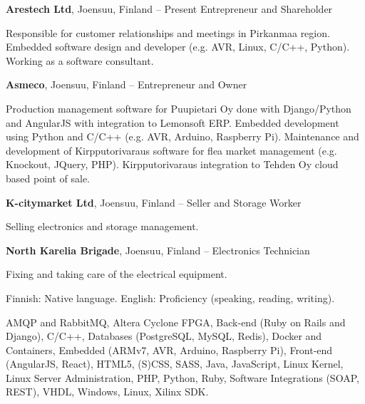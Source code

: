 \documentclass[letterpaper,MMMyyyy,nonstopmode]{simpleresumecv}
\begin{document}
\begin{Body}
\BigGap
\Entry
\textbf{Arestech Ltd}, Joensuu, Finland
\hfill
{} -- Present
\Gap
\BulletItem Entrepreneur and Shareholder
\begin{Detail}
    \SubBulletItem Responsible for customer relationships and meetings in
    Pirkanmaa region.
    \SubBulletItem Embedded software design and developer (e.g. AVR, Linux,
    C/C++, Python).
    \SubBulletItem Working as a software consultant.
\end{Detail}

\BigGap
\Entry
\textbf{Asmeco}, Joensuu, Finland
\hfill
{} -- 
\Gap
\BulletItem Entrepreneur and Owner
\begin{Detail}
    \SubBulletItem Production management software for Puupietari Oy done with
    Django/Python and \newline AngularJS with integration to Lemonsoft ERP.
    \SubBulletItem Embedded development using Python and C/C++ (e.g. AVR,
    Arduino, Raspberry Pi).
    \SubBulletItem Maintenance and development of Kirpputorivaraus software for
    flea market \newline management (e.g. Knockout, JQuery, PHP).
    \SubBulletItem Kirpputorivaraus integration to Tehden Oy cloud based point
    of sale.
\end{Detail}

\BigGap
\Entry
\textbf{K-citymarket Ltd}, Joensuu, Finland
\hfill
{} -- 
\Gap
\BulletItem Seller and Storage Worker
\begin{Detail}
    \SubBulletItem Selling electronics and storage management.
\end{Detail}

\BigGap
\Entry
\textbf{North Karelia Brigade}, Joensuu, Finland
\hfill
{} -- 
\Gap
\BulletItem Electronics Technician
\begin{Detail}
    \SubBulletItem Fixing and taking care of the electrical equipment.
\end{Detail}

\newpage



\BulletItem Finnish: Native language.
\Gap
\BulletItem English: Proficiency (speaking, reading, writing).



\Entry
\BulletItem AMQP and RabbitMQ,
\BulletItem Altera Cyclone FPGA,
\BulletItem Back-end (Ruby on Rails and Django),
\BulletItem C/C++,
\BulletItem Databases (PostgreSQL, MySQL, Redis),
\BulletItem Docker and Containers,
\BulletItem Embedded (ARMv7, AVR, Arduino, Raspberry Pi),
\BulletItem Front-end (AngularJS, React),
\BulletItem HTML5, (S)CSS, SASS,
\BulletItem Java,
\BulletItem JavaScript,
\BulletItem Linux Kernel,
\BulletItem Linux Server Administration,
\BulletItem PHP,
\BulletItem Python,
\BulletItem Ruby,
\BulletItem Software Integrations (SOAP, REST),
\BulletItem VHDL,
\BulletItem Windows, Linux,
\BulletItem Xilinx SDK.


\end{Body}
\end{document}
